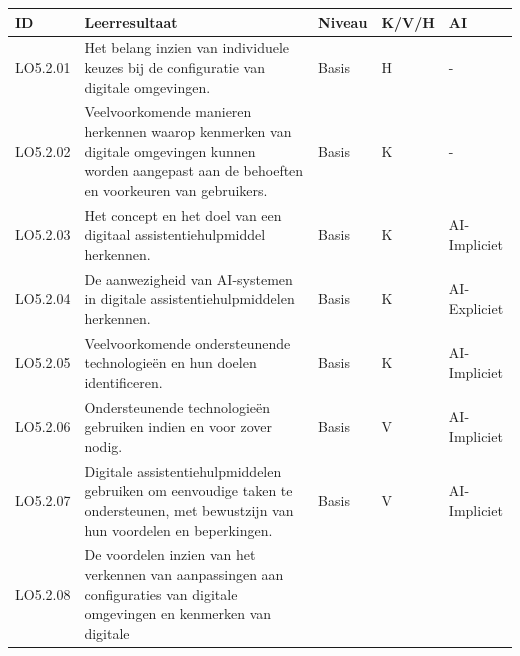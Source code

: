 \documentclass[
  dutch,
  letterpaper,
  DIV=11,
  numbers=noendperiod]{scrartcl}
\begin{document}
\begin{longtable}[]{@{}
  >{\centering\arraybackslash}p{}
  >{\centering\arraybackslash}p{}
  >{\centering\arraybackslash}p{}
  >{\centering\arraybackslash}p{}
  >{\centering\arraybackslash}p{}@{}}
\toprule\noalign{}
\begin{minipage}[b]{\linewidth}\centering
ID
\end{minipage} & \begin{minipage}[b]{\linewidth}\centering
Leerresultaat
\end{minipage} & \begin{minipage}[b]{\linewidth}\centering
Niveau
\end{minipage} & \begin{minipage}[b]{\linewidth}\centering
K/V/H
\end{minipage} & \begin{minipage}[b]{\linewidth}\centering
AI
\end{minipage} \\
\midrule\noalign{}
\endhead
\bottomrule\noalign{}
\endlastfoot
LO5.2.01 & Het belang inzien van individuele keuzes bij de configuratie
van digitale omgevingen. & Basis & H & - \\
LO5.2.02 & Veelvoorkomende manieren herkennen waarop kenmerken van
digitale omgevingen kunnen worden aangepast aan de behoeften en
voorkeuren van gebruikers. & Basis & K & - \\
LO5.2.03 & Het concept en het doel van een digitaal
assistentiehulpmiddel herkennen. & Basis & K & AI-Impliciet \\
LO5.2.04 & De aanwezigheid van AI-systemen in digitale
assistentiehulpmiddelen herkennen. & Basis & K & AI-Expliciet \\
LO5.2.05 & Veelvoorkomende ondersteunende technologieën en hun doelen
identificeren. & Basis & K & AI-Impliciet \\
LO5.2.06 & Ondersteunende technologieën gebruiken indien en voor zover
nodig. & Basis & V & AI-Impliciet \\
LO5.2.07 & Digitale assistentiehulpmiddelen gebruiken om eenvoudige
taken te ondersteunen, met bewustzijn van hun voordelen en beperkingen.
& Basis & V & AI-Impliciet \\
LO5.2.08 & De voordelen inzien van het verkennen van aanpassingen aan
configuraties van digitale omgevingen en kenmerken van digitale

\end{longtable}
\end{document}
